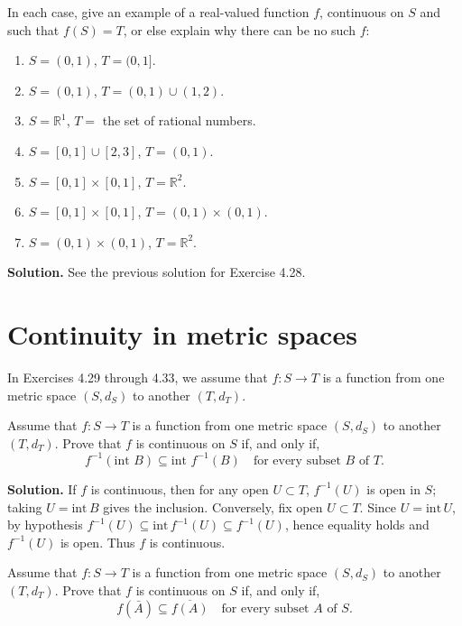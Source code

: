 \begin{problembox}
In each case, give an example of a real-valued function $f$, continuous on $S$ and such that $f(S) = T$, or else explain why there can be no such $f$:
\begin{enumerate}[label=(\alph*)]
\item $S = (0, 1)$, $T = (0, 1]$.
\item $S = (0, 1)$, $T = (0, 1) \cup (1, 2)$.
\item $S = \mathbb{R}^1$, $T =$ the set of rational numbers.
\item $S = [0, 1] \cup [2, 3]$, $T = (0, 1)$.
\item $S = [0, 1] \times [0, 1]$, $T = \mathbb{R}^2$.
\item $S = [0, 1] \times [0, 1]$, $T = (0, 1) \times (0, 1)$.
\item $S = (0, 1) \times (0, 1)$, $T = \mathbb{R}^2$.
\end{enumerate}
\end{problembox}

\noindent\textbf{Solution.} See the previous solution for Exercise 4.28.
\medskip

\section{Continuity in metric spaces}
In Exercises 4.29 through 4.33, we assume that $f:S\to T$ is a function from one metric space $(S,d_S)$ to another $(T,d_T)$.

\begin{problembox}
Assume that $f : S \rightarrow T$ is a function from one metric space $(S, d_S)$ to another $(T, d_T)$. Prove that $f$ is continuous on $S$ if, and only if,
\[ f^{-1}(\text{int } B) \subseteq \text{int } f^{-1}(B) \quad \text{for every subset } B \text{ of } T. \]
\end{problembox}

\noindent\textbf{Solution.}
If $f$ is continuous, then for any open $U\subset T$, $f^{-1}(U)$ is open in $S$; taking $U=\mathrm{int}\,B$ gives the inclusion. Conversely, fix open $U\subset T$. Since $U=\mathrm{int}\,U$, by hypothesis $f^{-1}(U)\subseteq\mathrm{int}\,f^{-1}(U)\subseteq f^{-1}(U)$, hence equality holds and $f^{-1}(U)$ is open. Thus $f$ is continuous.
\medskip

\begin{problembox}
Assume that $f : S \rightarrow T$ is a function from one metric space $(S, d_S)$ to another $(T, d_T)$. Prove that $f$ is continuous on $S$ if, and only if,
\[ f(\bar{A}) \subseteq \overline{f(A)} \quad \text{for every subset } A \text{ of } S. \]
\end{problembox}

